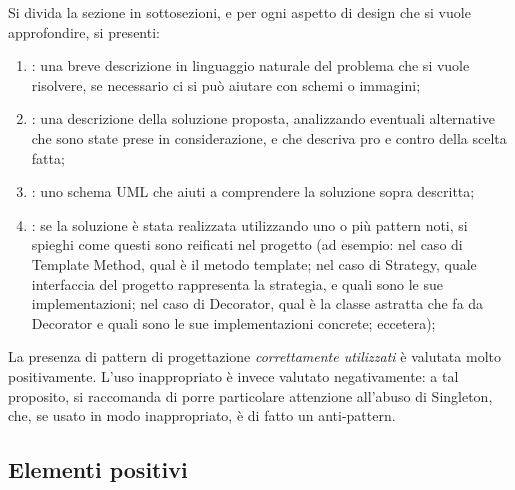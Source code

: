 \documentclass[a4paper,12pt]{report}
\begin{document}
Si divida la sezione in sottosezioni, e per ogni aspetto di design che si vuole approfondire, si presenti:
\begin{enumerate}
    \item: una breve descrizione in linguaggio naturale del problema che si vuole risolvere, se necessario ci si può aiutare con schemi o immagini;
    \item: una descrizione della soluzione proposta, analizzando eventuali alternative che sono state prese in considerazione, e che descriva pro e contro della scelta fatta;
    \item: uno schema UML che aiuti a comprendere la soluzione sopra descritta;
    \item: se la soluzione è stata realizzata utilizzando uno o più pattern noti, si spieghi come questi sono reificati nel progetto
    (ad esempio: nel caso di Template Method, qual è il metodo template;
    nel caso di Strategy, quale interfaccia del progetto rappresenta la strategia, e quali sono le sue implementazioni;
    nel caso di Decorator, qual è la classe astratta che fa da Decorator e quali sono le sue implementazioni concrete; eccetera);
\end{enumerate}
%
La presenza di pattern di progettazione \emph{correttamente utilizzati} è valutata molto positivamente.
%
L'uso inappropriato è invece valutato negativamente: a tal proposito, si raccomanda di porre particolare attenzione all'abuso di Singleton, che, se usato in modo inappropriato, è di fatto un anti-pattern.

\subsection*{Elementi positivi}
\end{document}
